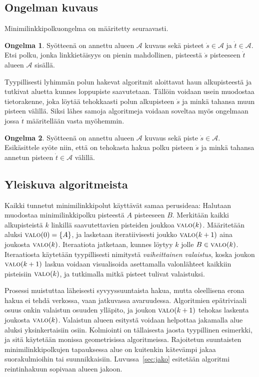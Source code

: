 \documentclass[finnish]{tktltiki2}
\theoremstyle{definition}
\newtheorem{ong}{Ongelma}
\theoremstyle{remark}
\newcommand\set[1]{\ensuremath{\left\{#1\right\}}\xspace}
\newcommand\spt{\ensuremath{\dot{s}}\xspace}
\newcommand\ept{\ensuremath{\dot{t}}\xspace}
\newcommand\fspace{\ensuremath{\mathcal{A}}\xspace}
\newcommand\reach[1]{\ensuremath{\textsc{valo}(#1)}\xspace}
\begin{document}
\subsection{Ongelman kuvaus}

Minimilinkkipolkuongelma on määritetty seuraavasti.
\begin{ong}
Syötteenä on annettu alueen \fspace kuvaus sekä pisteet $\spt\in\fspace$ ja $\ept\in\fspace$.
Etsi polku, jonka linkkietäisyys on pienin mahdollinen, pisteestä \spt pisteeseen \ept alueen \fspace sisällä.
\end{ong}

Tyypillisesti lyhimmän polun hakevat algoritmit aloittavat haun alkupisteestä ja tutkivat aluetta kunnes loppupiste saavutetaan.
Tällöin voidaan usein muodostaa tietorakenne, joka löytää tehokkaasti polun alkupisteen \spt ja minkä tahansa muun pisteen välillä.
Siksi lähes samoja algoritmeja voidaan soveltaa myös ongelmaan jossa \ept määritellään vasta myöhemmin.

\begin{ong}
Syötteenä on annettu alueen \fspace kuvaus sekä piste $\spt\in\fspace$.
Esikäsittele syöte niin, että on tehokasta hakua polku pisteen \spt ja minkä tahansa annetun pisteen $\ept\in\fspace$ välillä.
\end{ong}

\subsection{Yleiskuva algoritmeista}\label{sec:yleiskuva}

Kaikki tunnetut minimilinkkipolut käyttävät samaa perusideaa:
Halutaan muodostaa minimilinkkipolku pisteestä $A$ pisteeseen $B$.
Merkitään kaikki alkupisteistä $k$ linkillä saavutettavien pisteiden joukkoa \reach{k}.
Määritetään aluksi $\reach{0}=\set{A}$, ja lasketaan iteratiivisesti joukko \reach{k+1} aina joukosta \reach{k}.
Iteraatiota jatketaan, kunnes löytyy $k$ jolle $B\in\reach{k}$.
Iteraatiosta käytetään tyypillisesti nimitystä \emph{vaiheittainen valaistus}, koska joukon \reach{k+1} laskua voidaan visualisoida asettamalla valonlähteet kaikkiin pisteisiin \reach{k}, ja tutkimalla mitkä pisteet tulivat valaistuksi.

Prosessi muistuttaa läheisesti syvyyssuuntaista hakua, mutta oleellisena erona hakua ei tehdä verkossa, vaan jatkuvassa avaruudessa.
Algoritmien epätriviaali osuus onkin valaistun osuuden ylläpito, ja joukon \reach{k+1} tehokas laskenta joukosta \reach{k}.
Valaistun alueen esitystä voidaan helpottaa jakamalla alue aluksi yksinkertaisiin osiin.
Kolmiointi on tällaisesta jaosta tyypillinen esimerkki, ja sitä käytetään monissa geometrisissa algoritmeissa.
Rajoitetun suuntaisten minimilinkkipolkujen tapauksessa alue on kuitenkin kätevämpi jakaa suorakulmioihin tai suunnikkaisiin.
Luvussa~\ref{sec:jako} esitetään algoritmi reintinhakuun sopivaan alueen jakoon.
\end{document}
